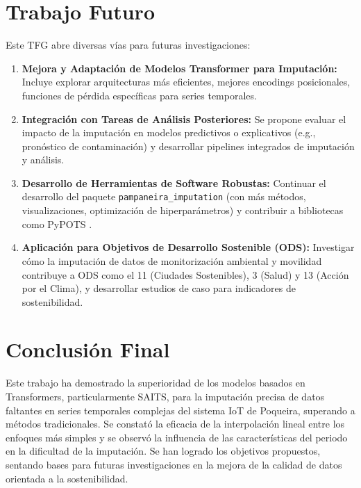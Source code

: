 \section{Trabajo Futuro}
\label{sec:trabajo_futuro_resumen}
Este TFG abre diversas vías para futuras investigaciones:
\begin{enumerate}
    \item \textbf{Mejora y Adaptación de Modelos Transformer para Imputación:} Incluye explorar arquitecturas más eficientes, mejores encodings posicionales, funciones de pérdida específicas para series temporales.
    \item \textbf{Integración con Tareas de Análisis Posteriores:} Se propone evaluar el impacto de la imputación en modelos predictivos o explicativos (e.g., pronóstico de contaminación) y desarrollar pipelines integrados de imputación y análisis.
    \item \textbf{Desarrollo de Herramientas de Software Robustas:} Continuar el desarrollo del paquete \texttt{pampaneira\_imputation} (con más métodos, visualizaciones, optimización de hiperparámetros) y contribuir a bibliotecas como PyPOTS \citep{du2023pypots}.
    \item \textbf{Aplicación para Objetivos de Desarrollo Sostenible (ODS):} Investigar cómo la imputación de datos de monitorización ambiental y movilidad contribuye a ODS como el 11 (Ciudades Sostenibles), 3 (Salud) y 13 (Acción por el Clima), y desarrollar estudios de caso para indicadores de sostenibilidad.
\end{enumerate}

\section{Conclusión Final}

Este trabajo ha demostrado la superioridad de los modelos basados en Transformers,
particularmente SAITS, para la imputación precisa de datos faltantes en series temporales
complejas del sistema IoT de Poqueira, superando a métodos tradicionales. Se constató la
eficacia de la interpolación lineal entre los enfoques más simples y se observó la influencia
de las características del periodo en la dificultad de la imputación. Se han logrado los objetivos propuestos, sentando bases para futuras investigaciones en la mejora de la calidad de datos orientada a la sostenibilidad.